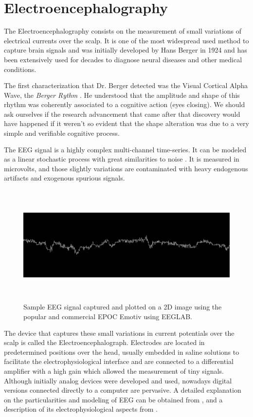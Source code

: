 \documentclass[sensors,article,submit,moreauthors,pdftex,10pt,a4paper]{mdpi}
\begin{document}
\section{Electroencephalography}

The Electroencephalography consists on the measurement of small variations of electrical currents over the scalp.  It is one of the most widespread used method to capture brain signals and was initially developed by Hans Berger in 1924 and has been extensively used for decades to diagnose neural diseases and other medical conditions.

The first characterization that Dr. Berger detected was the Visual Cortical Alpha Wave, the \textit{Berger Rythm} \citep{Jansen1991}.  He understood that the amplitude and shape of this rhythm was coherently associated to a cognitive action (eyes closing).  
We should ask ourselves if the research advancement that came after that discovery would have happened if it weren't so evident that the shape alteration was due to a very simple and verifiable cognitive process.

The EEG signal is a highly complex multi-channel time-series.  It can be modeled as a linear stochastic process with great similarities to noise \citep{Thakor2004}.  It is measured in microvolts, and those slightly variations are contaminated with heavy endogenous artifacts and exogenous spurious signals.  
 
\begin{figure}[H]
\centering
\includegraphics[height=6cm,width=12cm]{images/eegsample.png}
\caption{Sample EEG signal captured and plotted on a 2D image using the popular and commercial EPOC Emotiv using EEGLAB.}
\label{fig:sampleeeg}
\end{figure}

The device that captures these small variations in current potentials over the scalp is called the Electroencephalograph.  Electrodes are located in predetermined positions over the head, usually embedded in saline solutions to facilitate the electrophysiological interface and are connected to a differential amplifier with a high gain which allowed the measurement of tiny signals. Although initially analog devices were developed and used, nowadays digital versions connected directly to a computer are pervasive.  A detailed explanation on the particularities and modeling of EEG can be obtained from \citep{Jackson2014}, and a description of its electrophysiological aspects from \citep{Haberman2012}.
\end{document}

